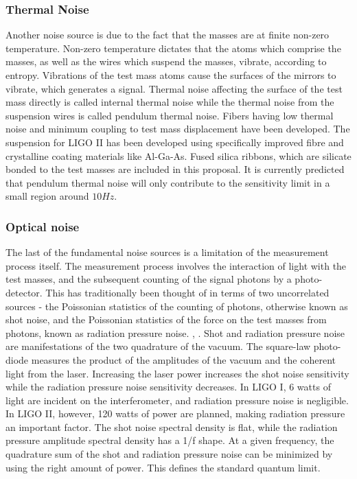 \subsubsection{Thermal Noise}

Another noise source is due to the fact that the masses are at finite non-zero temperature. Non-zero temperature dictates that the atoms which comprise the masses, as well as the wires which suspend the masses, vibrate, according to entropy. Vibrations of the test mass atoms cause the surfaces of the mirrors to vibrate, which generates a signal. Thermal noise affecting the surface of the test mass directly is called internal thermal noise while the thermal noise from the suspension wires is called pendulum thermal noise. Fibers having low thermal noise and minimum coupling to test mass displacement have been developed. The suspension for LIGO II has been developed using specifically improved fibre and crystalline coating materials like Al-Ga-As. Fused silica ribbons, which are silicate bonded to the test masses are included in this proposal. It is currently predicted that pendulum thermal noise will only contribute to the sensitivity limit in a small region around $10 Hz$.

\subsubsection{Optical noise}

The last of the fundamental noise sources is a limitation of the measurement process itself. The measurement process involves the interaction of light with the test masses, and the subsequent counting of the signal photons by a photo-detector. This has traditionally been thought of in terms of two uncorrelated sources - the Poissonian statistics of the counting of photons, otherwise known as shot noise, and the Poissonian statistics of the force on the test masses from photons, known as radiation pressure noise. \cite{weiss1972electronically} , \cite{saulson1994fundamentals}. Shot and radiation pressure noise are manifestations of the two quadrature of the vacuum. The square-law photo-diode measures the product of the amplitudes of the vacuum and the coherent light from the laser. Increasing the laser power increases the shot noise sensitivity while the radiation pressure noise sensitivity decreases. In LIGO I, 6 watts of light are incident on the interferometer, and radiation pressure noise is negligible. In LIGO II, however, 120 watts of power are planned, making radiation pressure an important factor. The shot noise spectral density is flat, while the radiation pressure amplitude spectral density has a 1/f shape. At a given frequency, the quadrature sum of the shot and radiation pressure noise can be minimized by using the right amount of power. This defines the standard quantum limit. \cite{braginsky1995quantum}

